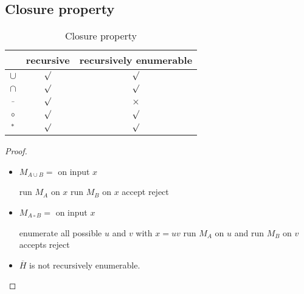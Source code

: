 \subsection{Closure property}
\begin{table}[!htb]
    \centering
    \caption{Closure property}
    \begin{tabular}[c]{ccc}\toprule
         &recursive & recursively enumerable \\ \midrule
        $\cup$ &  $\surd$ & $\surd$  \\
        $\cap$ &  $\surd$ & $\surd$ \\
        $\bar{}$ &$\surd$ & $\times$ \\
        $\circ$ & $\surd$ & $\surd$ \\
        ${}^*$ &  $\surd$ & $\surd$ \\
        \bottomrule
    \end{tabular}
\end{table}

\begin{proof}\quad

    \begin{itemize}
        \item $M_{A\cup B}=$ on input $x$
        \begin{algorithm}[H]
            \caption{$M_{A\cup B}$}
            \begin{algorithmic}
                \State run $M_A$ on $x$
                \State run $M_B$ on $x$
                    accept
                \Else
                    \quad reject
                \EndIf
            \end{algorithmic}
        \end{algorithm}
        \item $M_{A\circ B}=$ on input $x$
        \begin{algorithm}[H]
            \caption{$M_{A\circ B}$}
            \begin{algorithmic}
                \State enumerate all possible $u$ and $v$ with $x=uv$
                \State run $M_A$ on $u$ and run $M_B$ on $v$
                    accepts
                \Else
                    \quad reject
                \EndIf
            \end{algorithmic}
        \end{algorithm}
        
        \item $\overline{H}$ is not recursively enumerable. 
    \end{itemize}
\end{proof}

